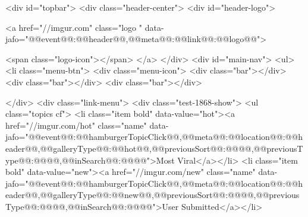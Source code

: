 <div id="topbar">
    <div class="header-center">
        <div id="header-logo">

            <a href="//imgur.com" class="logo " data-jafo="{@@event@@:@@header@@,@@meta@@:{@@link@@:@@logo@@}}">
                
                <span class="logo-icon"></span>
            </a>
        </div>
        <div id="main-nav">
            <ul>
                <li class="menu-btn">
                    <div class="menu-icon">
                        <div class="bar"></div>
                        <div class="bar"></div>
                        <div class="bar"></div>
                        
                    </div>
                    <div class="link-menu">
                        <div class="test-1868-show">
                            <ul class="topics cf">
                                <li class="item bold" data-value="hot"><a href="//imgur.com/hot" class="name" data-jafo="{@@event@@:@@hamburgerTopicClick@@,@@meta@@:{@@location@@:@@header@@,@@galleryType@@:@@hot@@,@@previousSort@@:@@@@,@@previousType@@:@@@@,@@inSearch@@:@@@@}}">Most Viral</a></li>
                                <li class="item bold" data-value="new"><a href="//imgur.com/new" class="name" data-jafo="{@@event@@:@@hamburgerTopicClick@@,@@meta@@:{@@location@@:@@header@@,@@galleryType@@:@@new@@,@@previousSort@@:@@@@,@@previousType@@:@@@@,@@inSearch@@:@@@@}}">User Submitted</a></li>
                                
